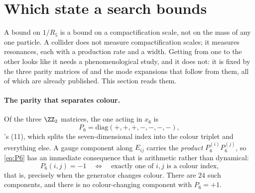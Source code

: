 %
\section{Which state a search bounds}\label{sec:collider}

A bound on $1/R_5$ is a bound on a compactification scale, not on the mass of any one particle. A
collider does not measure compactification scales; it measures resonances, each with a production
rate and a width. Getting from one to the other looks like it needs a phenomenological study, and
it does not: it is fixed by the three parity matrices of \cite{KM25} and the mode expansions that
follow from them, all of which are already published. This section reads them.

\paragraph{The parity that separates colour.} Of the three $\ZZ_2$ matrices, the one acting in
$x_6$ is
\begin{equation}\label{eq:P6}
  P_6=\mathrm{diag}(+,+,+,-,-,-,-),
\end{equation}
\cite{KM25}'s (11), which splits the seven-dimensional index into the colour triplet and
everything else. A gauge component along $E_{ij}$ carries the \emph{product} $P_6^{(i)}P_6^{(j)}$,
so \eqref{eq:P6} has an immediate consequence that is arithmetic rather than dynamical:
\begin{equation}\label{eq:colourparity}
  P_6(i,j)=-1
  \quad\Longleftrightarrow\quad
  \text{exactly one of } i,j \text{ is a colour index,}
\end{equation}
that is, precisely when the generator changes colour. There are $24$ such components, and there is
no colour-changing component with $P_6=+1$.


